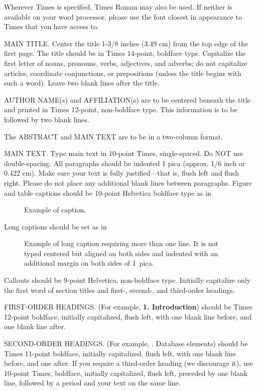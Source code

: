 \documentclass[times, 10pt,two column]{article}
\begin{document}

Wherever Times is specified, Times Roman may also be used. If neither is 
available on your word processor, please use the font closest in 
appearance to Times that you have access to.

MAIN TITLE. Center the title 1-3/8 inches (3.49 cm) from the top edge of 
the first page. The title should be in Times 14-point, boldface type. 
Capitalize the first letter of nouns, pronouns, verbs, adjectives, and 
adverbs; do not capitalize articles, coordinate conjunctions, or 
prepositions (unless the title begins with such a word). Leave two blank 
lines after the title.

AUTHOR NAME(s) and AFFILIATION(s) are to be centered beneath the title 
and printed in Times 12-point, non-boldface type. This information is to 
be followed by two blank lines.

The ABSTRACT and MAIN TEXT are to be in a two-column format. 

MAIN TEXT. Type main text in 10-point Times, single-spaced. Do NOT use 
double-spacing. All paragraphs should be indented 1 pica (approx. 1/6 
inch or 0.422 cm). Make sure your text is fully justified---that is, 
flush left and flush right. Please do not place any additional blank 
lines between paragraphs. Figure and table captions should be 10-point 
Helvetica boldface type as in
\begin{figure}[h]
   \caption{Example of caption.}
\end{figure}

\noindent Long captions should be set as in 
\begin{figure}[h] 
   \caption{Example of long caption requiring more than one line. It is 
     not typed centered but aligned on both sides and indented with an 
     additional margin on both sides of 1~pica.}
\end{figure}

\noindent Callouts should be 9-point Helvetica, non-boldface type. 
Initially capitalize only the first word of section titles and first-, 
second-, and third-order headings.

FIRST-ORDER HEADINGS. (For example, {\large \bf 1. Introduction}) 
should be Times 12-point boldface, initially capitalized, flush left, 
with one blank line before, and one blank line after.

SECOND-ORDER HEADINGS. (For example, {. Database elements}) 
should be Times 11-point boldface, initially capitalized, flush left, 
with one blank line before, and one after. If you require a third-order 
heading (we discourage it), use 10-point Times, boldface, initially 
capitalized, flush left, preceded by one blank line, followed by a period 
and your text on the same line.
\end{document}
